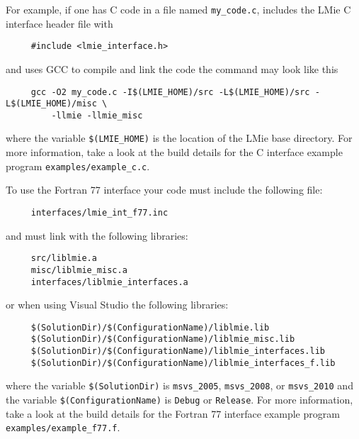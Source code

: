 For example, if one has C code in a file named \texttt{my\_code.c}, includes the LMie C interface header file with
\begin{verbatim}
     #include <lmie_interface.h>
\end{verbatim}
and uses GCC to compile and link the code the command may look like this
\begin{verbatim}
     gcc -O2 my_code.c -I$(LMIE_HOME)/src -L$(LMIE_HOME)/src -L$(LMIE_HOME)/misc \
         -llmie -llmie_misc
\end{verbatim}
where the variable \texttt{\$(LMIE\_HOME)} is the location of the LMie base directory.  For more information, take a look at the build details for the C interface example program \texttt{examples/example\_c.c}.


\label{building_and_using_lmie_using_lmie_in_your_code_fortran_77}

To use the Fortran 77 interface your code must include the following file:
\begin{verbatim}
     interfaces/lmie_int_f77.inc
\end{verbatim}
and must link with the following libraries:
\begin{verbatim}
     src/liblmie.a
     misc/liblmie_misc.a
     interfaces/liblmie_interfaces.a
\end{verbatim}
or when using Visual Studio the following libraries:
\begin{verbatim}
     $(SolutionDir)/$(ConfigurationName)/liblmie.lib
     $(SolutionDir)/$(ConfigurationName)/liblmie_misc.lib
     $(SolutionDir)/$(ConfigurationName)/liblmie_interfaces.lib
     $(SolutionDir)/$(ConfigurationName)/liblmie_interfaces_f.lib
\end{verbatim}
where the variable \texttt{\$(SolutionDir)} is \texttt{msvs\_2005}, \texttt{msvs\_2008}, or \texttt{msvs\_2010} and the variable \texttt{\$(ConfigurationName)} is \texttt{Debug} or \texttt{Release}.  For more information, take a look at the build details for the Fortran 77 interface example program \texttt{examples/example\_f77.f}.


\label{building_and_using_lmie_using_lmie_in_your_code_fortran_90}

